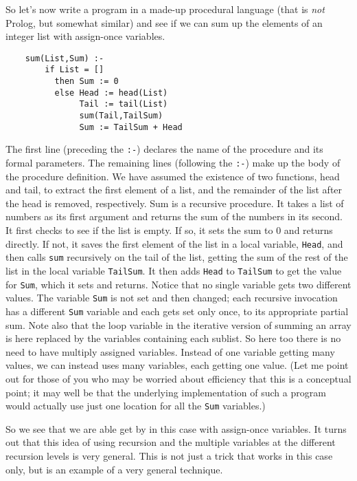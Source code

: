 So let's now write a program in a made-up procedural language (that is
{\em not} Prolog, but somewhat similar) and see if we can sum up the
elements of an integer list with assign-once variables.

\begin{verbatim}
    sum(List,Sum) :-
        if List = []
          then Sum := 0
          else Head := head(List)
               Tail := tail(List)
               sum(Tail,TailSum)
               Sum := TailSum + Head
\end{verbatim}
The first line (preceding the \verb|:-|) declares the name of the
procedure and its formal parameters.  The remaining lines (following
the \verb|:-|) make up the body of the procedure definition.  We have
assumed the existence of two functions, head and tail, to extract the
first element of a list, and the remainder of the list after the head
is removed, respectively.  Sum is a recursive procedure.  It takes a
list of numbers as its first argument and returns the sum of the
numbers in its second.  It first checks to see if the list is empty.
If so, it sets the sum to 0 and returns directly.  If not, it saves
the first element of the list in a local variable, \verb|Head|, and
then calls \verb|sum| recursively on the tail of the list, getting the
sum of the rest of the list in the local variable \verb|TailSum|.  It
then adds \verb|Head| to \verb|TailSum| to get the value for
\verb|Sum|, which it sets and returns.  Notice that no single variable
gets two different values.  The variable \verb|Sum| is not set and
then changed; each recursive invocation has a different \verb|Sum|
variable and each gets set only once, to its appropriate partial sum.
Note also that the loop variable in the iterative version of summing
an array is here replaced by the variables containing each sublist.
So here too there is no need to have multiply assigned variables.
Instead of one variable getting many values, we can instead uses many
variables, each getting one value.  (Let me point out for those of you
who may be worried about efficiency that this is a conceptual point;
it may well be that the underlying implementation of such a program
would actually use just one location for all the \verb|Sum|
variables.)

So we see that we are able get by in this case
with assign-once variables.  It turns out
that this idea of using recursion and the multiple variables at the
different recursion levels is very general.  This is not just a trick
that works in this case only, but is an example of a very general
technique.

